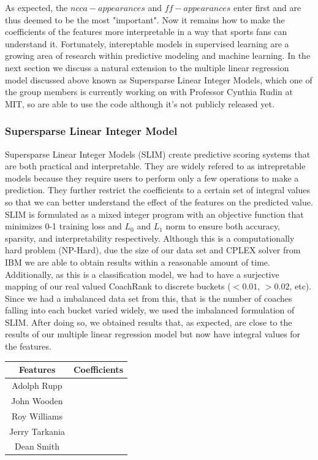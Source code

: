 \documentclass[titlepage,12pt]{article}
\begin{document}
As expected, the $ncca-appearances$ and $ff-appearances$ enter first and are thus deemed to be the most "important". Now it remains how to make the coefficients of the features more interpretable in a way that sports fans can understand it. Fortunately, intereptable models in supervised learning are a growing area of research within predictive modeling and machine learning. In the next section we discuss a natural extension to the multiple linear regression model discussed above known as Supersparse Linear Integer Models, which one of the group members is currently working on with Professor Cynthia Rudin at MIT, so are able to use the code although it's not publicly released yet.

\subsubsection*{Supersparse Linear Integer Model}

Supersparse Linear Integer Models (SLIM) create predictive scoring systems that are both practical and interpretable. They are widely refered to as intrepretable models because they require users to perform only a few operations to make a prediction. They further restrict the coefficients to a certain set of integral values so that we can better understand the effect of the features on the predicted value. SLIM is formulated as a mixed integer program with an objective function that minimizes 0-1 training loss and $L_0$ and $L_1$ norm to ensure both accuracy, sparsity, and interpretability respectively. Although this is a computationally hard problem (NP-Hard), due the size of our data set and CPLEX solver from IBM we are able to obtain results within a reasonable amount of time. Additionally, as this is a classification model, we had to have a surjective mapping of our real valued CoachRank to discrete buckets ($<0.01$, $>0.02$, etc). Since we had a imbalanced data set from this, that is the number of coaches falling into each bucket varied widely, we used the imbalanced formulation of SLIM. After doing so, we obtained results that, as expected, are close to the results of our multiple linear regression model but now have integral values for the features.        

\begin{center}
\begin{tabular}{ | c | c |}
\hline
Features         & Coefficients \\\hline
Adolph Rupp      &      \\\hline
John Wooden      &      \\\hline
Roy Williams     &      \\\hline
Jerry Tarkania   &      \\\hline
Dean Smith       &      \\
\hline
\end{tabular}
\end{center}
\end{document}
